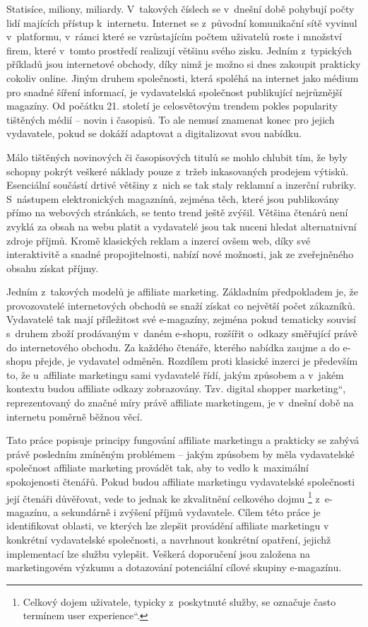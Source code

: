 \documentclass[12pt,oneside,openany]{fithesis}
\begin{document}
Statisíce, miliony, miliardy. V~takových číslech se v~dnešní době 
pohybují počty lidí majících přístup k~internetu. Internet se 
z~původní komunikační sítě vyvinul v~platformu, v~rámci které se 
vzrůstajícím počtem uživatelů roste i množství firem, které v~tomto 
prostředí realizují většinu svého zisku. Jedním z~typických příkladů 
jsou internetové obchody, díky nimž je možno si dnes zakoupit prakticky 
cokoliv online. Jiným druhem společnosti, která spoléhá na internet jako 
médium pro snadné šíření informací, je vydavatelská společnost 
publikující nejrůznější magazíny. Od počátku 21. století je 
celosvětovým trendem pokles popularity tištěných médií -- novin i 
časopisů. To ale nemusí znamenat konec pro jejich vydavatele, pokud se 
dokáží adaptovat a digitalizovat svou nabídku. \cite{decline-of-print}

Málo tištěných novinových či časopisových titulů se mohlo chlubit 
tím, že byly schopny pokrýt veškeré náklady pouze z~tržeb inkasovaných 
prodejem výtisků. Esenciální součástí drtivé většiny z~nich se tak 
staly reklamní a inzerční rubriky. S~nástupem elektronických magaznínů, 
zejména těch, které jsou publikovány přímo na webových stránkách, se 
tento trend ještě zvýšil. Většina čtenárů není zvyklá za obsah na 
webu platit a vydavatelé jsou tak nuceni hledat alternatnivní zdroje 
příjmů. Kromě klasických reklam a inzercí ovšem web, díky své 
interaktivitě a snadné propojitelnosti, nabízí nové možnosti, jak ze 
zveřejněného obsahu získat příjmy.

Jedním z~takových modelů je affiliate marketing. Základním předpokladem 
je, že provozovatelé internetových obchodů se snaží získat co 
největší počet zákazníků. Vydavatelé tak mají příležitost své 
e-magazíny, zejména pokud tematicky souvisí s~druhem zboží prodávaným 
v~daném e-shopu, rozšířit o~odkazy směřující právě do internetového 
obchodu. Za každého čtenáře, kterého nabídka zaujme a do e-shopu 
přejde, je vydavatel odměněn. Rozdílem proti klasické inzerci je 
především to, že u~affiliate marketingu sami vydavatelé řídí, jakým 
způsobem a v~jakém kontextu budou affiliate odkazy zobrazovány. Tzv. \glqq 
digital shopper marketing\textquotedblleft{}, reprezentovaný do značné míry 
právě affiliate marketingem, je v~dnešní době na internetu poměrně 
běžnou věcí. \cite{marketingova-komunikace}

Tato práce popisuje principy fungování affiliate marketingu a prakticky se 
zabývá právě posledním zmíněným problémem -- jakým způsobem by měla 
vydavatelské společnost affiliate marketing provádět tak, aby to vedlo 
k~maximální spokojenosti čtenářů. Pokud budou affiliate marketingu 
vydavatelské společnosti její čtenáři důvěřovat, vede to jednak ke 
zkvalitnění celkového dojmu
\footnote{Celkový dojem uživatele, typicky z~poskytnuté služby, se označuje 
často termínem \glqq user experience\textquotedblleft{}.} 
z~e-magazínu, a sekundárně i zvýšení příjmů vydavatele. Cílem této práce 
je identifikovat oblasti, ve kterých lze zlepšit provádění
affiliate marketingu v konkrétní vydavatelské společnosti, a navrhnout
konkrétní opatření, jejichž implementací lze službu vylepšit. Veškerá
doporučení jsou založena na marketingovém výzkumu a dotazování potenciální
cílové skupiny e-magazínu.
\end{document}
